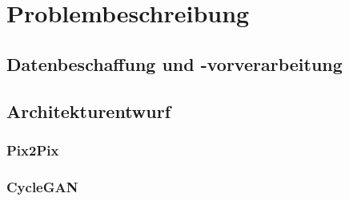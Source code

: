 \chapter{Problembeschreibung}

\section{Datenbeschaffung und -vorverarbeitung}

\section{Architekturentwurf}
\subsection*{Pix2Pix}
\subsection*{CycleGAN}